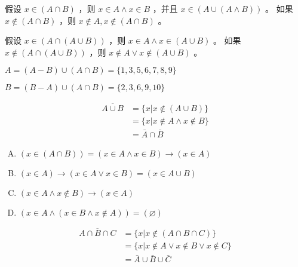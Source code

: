 {{        %
        \begin{practices}
            假设 $x \in (A \cap B)$ ，则 $x \in A \wedge x \in B$ ，并且 $x \in (A \cup (A \wedge B))$ 。
            如果 $x \notin (A \cap B)$ ，则 $x \notin A, x \notin (A \cap B)$ 。
        \end{practices}

        \begin{practices}
            假设 $x \in (A \cap (A \cup B))$ ，则 $x \in A \wedge x \in (A \cup B)$ 。
            如果 $x \notin (A \cap (A \cup B))$ ，则 $x \notin A \vee x \notin (A \cup B)$ 。
        \end{practices}

        \begin{practices}
            $A = (A - B) \cup (A \cap B) = \{1, 3, 5, 6, 7, 8, 9\}$

            $B = (B - A) \cup (A \cap B) = \{2, 3, 6, 9, 10\}$
        \end{practices}

        \begin{practices}
            \begin{align*}
                \overline{A \cup B}
                &= \{x | x \notin (A \cup B)\} \\
                &= \{x | x \notin A \wedge x \notin B\} \\
                &= \bar{A} \cap \bar{B}
            \end{align*}
        \end{practices}

        \begin{practices}
            \begin{enumerate}[A.]
                \item $(x \in (A \cap B)) = (x \in A \wedge x \in B) \rightarrow (x \in A)$
                \item $(x \in A) \rightarrow (x \in A \vee x \in B) = (x \in A \cup B)$
                \item $(x \in A \wedge x \notin B) \rightarrow (x \in A)$
                \item $(x \in A \wedge (x \in B \wedge x \notin A)) = (\varnothing)$
            \end{enumerate}
        \end{practices}

        \begin{practices}
            \begin{align*}
                \overline{A \cap B \cap C}
                &= \{x | x \notin (A \cap B \cap C)\} \\
                &= \{x | x \notin A \vee x \notin B \vee x \notin C\} \\
                &= \bar{A} \cup \bar{B} \cup \bar{C}
            \end{align*}
        \end{practices}

}}
